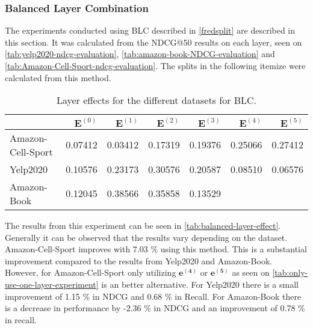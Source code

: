 \subsubsection{Balanced Layer Combination}
The experiments conducted using BLC described in \autoref{fredsplit} are described in this section.
It was calculated from the NDCG@50 results on each layer, seen on \autoref{tab:yelp2020-ndcg-evaluation}, \autoref{tab:amazon-book-NDCG-evaluation} and \autoref{tab:Amazon-Cell-Sport-ndcg-evaluation}.
The splits in the following itemize were calculated from this method.
\begin{table*}[]
    \centering
    \begin{tabular}{|l|r|r|r|r|r|r|}
        \hline
                          & $\mathbf{E}^{(0)}$ & $\mathbf{E}^{(1)}$ & $\mathbf{E}^{(2)}$ & $\mathbf{E}^{(3)}$ & $\mathbf{E}^{(4)}$ & $\mathbf{E}^{(5)}$ \\ \hline
        Amazon-Cell-Sport & 0.07412            & 0.03412            & 0.17319            & 0.19376            & 0.25066            & 0.27412            \\ \hline
        Yelp2020          & 0.10576            & 0.23173            & 0.30576            & 0.20587            & 0.08510            & 0.06576            \\ \hline
        Amazon-Book       & 0.12045            & 0.38566            & 0.35858            & 0.13529            &                    &                    \\ \hline
    \end{tabular}
    \caption{Layer effects for the different datasets for BLC.}
    \label{tab:layer-effect}
\end{table*}
The results from this experiment can be seen in \autoref{tab:balanced-layer-effect}.
Generally it can be observed that the results vary depending on the dataset.
Amazon-Cell-Sport improves with 7.03 \% using this method.
This is a substantial improvement compared to the results from Yelp2020 and Amazon-Book.
However, for Amazon-Cell-Sport only utilizing $\mathbf{e^{(4)}}$ or $\mathbf{e^{(5)}}$ as seen on \autoref{tab:only-use-one-layer-experiment} is an better alternative.
For Yelp2020 there is a small improvement of 1.15 \% in NDCG and 0.68 \% in Recall.
For Amazon-Book there is a decrease in performance by -2.36 \% in NDCG and an improvement of 0.78 \% in recall.

